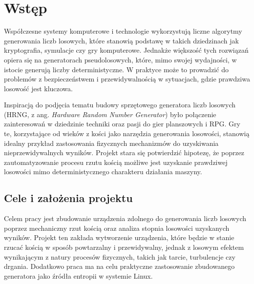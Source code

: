 \chapter{Wstęp}\label{ch:wstep}



Współczesne systemy komputerowe i technologie wykorzystują liczne algorytmy generowania liczb losowych, które stanowią podstawę w takich dziedzinach jak kryptografia,
symulacje czy gry komputerowe.
Jednakże większość tych rozwiązań opiera się na generatorach pseudolosowych,
które, mimo swojej wydajności, w istocie generują liczby deterministyczne.
W praktyce może to prowadzić do problemów z bezpieczeństwem i przewidywalnością w sytuacjach, gdzie prawdziwa losowość jest kluczowa.

Inspiracją do podjęcia tematu budowy sprzętowego generatora liczb losowych (HRNG, z ang. \textit{Hardware Random Number Generator})
było połączenie zainteresowań w dziedzinie techniki oraz pasji do gier planszowych i RPG. %
Gry te, korzystające od wieków z kości jako narzędzia generowania losowości, stanowią idealny przykład zastosowania fizycznych mechanizmów do uzyskiwania nieprzewidywalnych wyników.
Projekt stara się potwierdzić hipotezę, że poprzez zautomatyzowanie procesu rzutu kością możliwe jest uzyskanie prawdziwej losowości mimo deterministycznego charakteru działania maszyny.

\section{Cele i założenia projektu}\label{sec:cel-projektu}

Celem pracy jest zbudowanie urządzenia zdolnego do generowania liczb losowych poprzez mechaniczny rzut kością oraz analiza stopnia losowości uzyskanych wyników.
Projekt ten zakłada wytworzenie urządzenia, które będzie w stanie rzucać kością w sposób powtarzalny i przewidywalny,
jednak z losowym efektem wynikającym z natury procesów fizycznych, takich jak tarcie, turbulencje czy drgania.
Dodatkowo praca ma na celu praktyczne zastosowanie zbudowanego generatora jako źródła entropii w systemie Linux.

